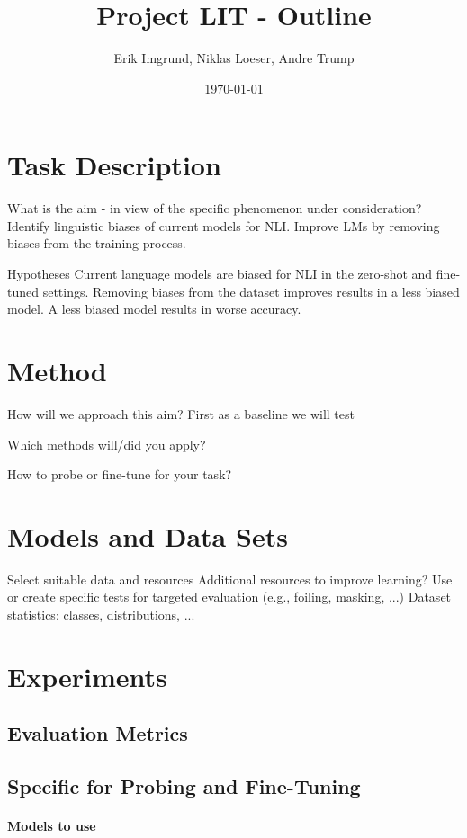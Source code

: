 \documentclass[12pt,a4paper]{article}
\title{Project LIT - Outline}
\author{Erik Imgrund, Niklas Loeser, Andre Trump}
\date{\today}
\begin{document}
\maketitle

\section{Task Description}
What is the aim - in view of the specific phenomenon under consideration?
Identify linguistic biases of current models for NLI. Improve LMs by removing biases from the training process.

Hypotheses
Current language models are biased for NLI in the zero-shot and fine-tuned settings.
Removing biases from the dataset improves results in a less biased model.
A less biased model results in worse accuracy.

\section{Method}
How will we approach this aim?
First as a baseline we will test 

Which methods will/did you apply?

How to probe or fine-tune for your task?

\section{Models and Data Sets}
Select suitable data and resources
Additional resources to improve learning?
Use or create specific tests for targeted
evaluation (e.g., foiling, masking, ...)
Dataset statistics: classes, distributions, ...

\section{Experiments}

\subsection{Evaluation Metrics}

\subsection{Specific for Probing and Fine-Tuning}
\paragraph{Models to use}
\end{document}
